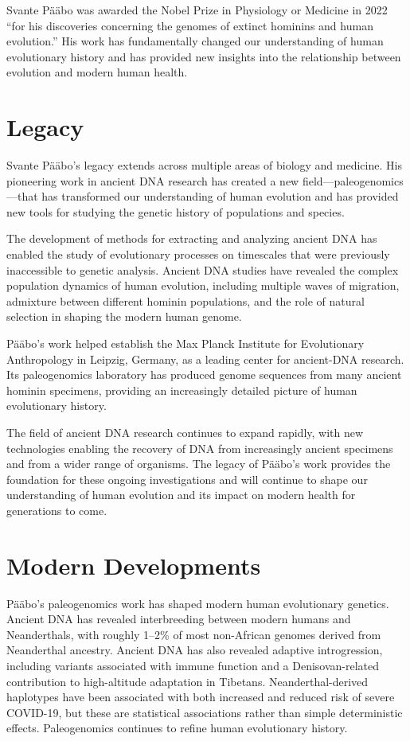 Svante P\"a\"abo was awarded the Nobel Prize in Physiology or Medicine in 2022 ``for his discoveries concerning the genomes of extinct hominins and human evolution.'' His work has fundamentally changed our understanding of human evolutionary history and has provided new insights into the relationship between evolution and modern human health.

\section{Legacy}

Svante P\"a\"abo's legacy extends across multiple areas of biology and medicine. His pioneering work in ancient DNA research has created a new field---paleogenomics---that has transformed our understanding of human evolution and has provided new tools for studying the genetic history of populations and species.

The development of methods for extracting and analyzing ancient DNA has enabled the study of evolutionary processes on timescales that were previously inaccessible to genetic analysis. Ancient DNA studies have revealed the complex population dynamics of human evolution, including multiple waves of migration, admixture between different hominin populations, and the role of natural selection in shaping the modern human genome.

P\"a\"abo's work helped establish the Max Planck Institute for Evolutionary Anthropology in Leipzig, Germany, as a leading center for ancient-DNA research. Its paleogenomics laboratory has produced genome sequences from many ancient hominin specimens, providing an increasingly detailed picture of human evolutionary history.

The field of ancient DNA research continues to expand rapidly, with new technologies enabling the recovery of DNA from increasingly ancient specimens and from a wider range of organisms. The legacy of P\"a\"abo's work provides the foundation for these ongoing investigations and will continue to shape our understanding of human evolution and its impact on modern health for generations to come.


\section{Modern Developments}

P\"a\"abo's paleogenomics work has shaped modern human evolutionary genetics. Ancient DNA has revealed interbreeding between modern humans and Neanderthals, with roughly 1--2\% of most non-African genomes derived from Neanderthal ancestry. Ancient DNA has also revealed adaptive introgression, including variants associated with immune function and a Denisovan-related contribution to high-altitude adaptation in Tibetans. Neanderthal-derived haplotypes have been associated with both increased and reduced risk of severe COVID-19, but these are statistical associations rather than simple deterministic effects. Paleogenomics continues to refine human evolutionary history.


